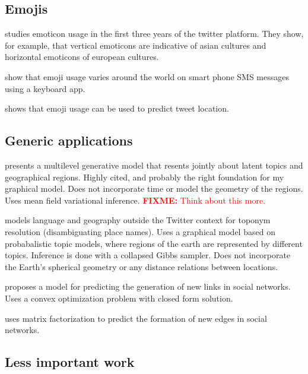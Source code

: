\documentclass{article}
\newcommand{\fixme}[1]{\textcolor{red}{\textbf{FIXME:} {#1}}}
\begin{document}

\subsection{Emojis}

\citet{park2013emoticon} studies emoticon usage in the first three years of the twitter platform.
They show, for example, that vertical emoticons are indicative of asian cultures and horizontal emoticons of european cultures.

\citet{lu2016learning} show that emoji usage varies around the world on smart phone SMS messages using a keyboard app.

\citet{ljubevsic2016global} shows that emoji usage can be used to predict tweet location.


\subsection{Generic applications}

\citet{eisenstein2010latent} presents a multilevel generative model that resents jointly about latent topics and geographical regions.
Highly cited, and probably the right foundation for my graphical model.
Does not incorporate time or model the geometry of the regions.
Uses mean field variational inference.
\fixme{Think about this more.}

\citet{speriosu2010connecting} models language and geography outside the Twitter context for toponym resolution (disambiguating place names).
Uses a graphical model based on probabalistic topic models,
where regions of the earth are represented by different topics.
Inference is done with a collapsed Gibbs sampler.
Does not incorporate the Earth's spherical geometry or any distance relations between locations.

\citet{wu2017link} proposes a model for predicting the generation of new links in social networks. 
Uses a convex optimization problem with closed form solution.

\citet{yu2017temporally} uses matrix factorization to predict the formation of new edges in social networks.


\subsection{Less important work}
\end{document}
